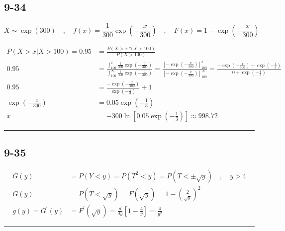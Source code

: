 \documentclass{article}
\newcommand{\qline}{\par\noindent\rule{4.5in}{1pt}}
\begin{document}
	\clearpage

		\subsection*{9-34}

			\[
				X \sim \exp(300) \quad,\quad f(x) = \frac{1}{300} \exp\left( -\frac{x}{300} \right) \quad,\quad F(x) = 1 - \exp\left( -\frac{x}{300} \right)
			\]

			\begin{equation*}
				\begin{split}
					P(X > x | X > 100) = 0.95 &= \frac{P(X > x \cap X > 100)}{P(X > 100)} \\
					0.95 &= \frac{\int_{100}^{x} \frac{1}{300} \exp\left( -\frac{x}{300} \right)}{\int_{100}^{\infty} \frac{1}{300} \exp\left( -\frac{x}{300} \right)} = \frac{\left[ -\exp\left( -\frac{x}{300} \right) \right]^x_{100}}{\left[ -\exp\left( -\frac{x}{300} \right) \right]^{\infty}_{100}} = \frac{-\exp\left( -\frac{x}{300} \right) + \exp\left( -\frac{1}{3} \right)}{0 + \exp\left( -\frac{1}{3} \right)} \\
					0.95 &= \frac{-\exp\left( -\frac{x}{300} \right)}{\exp\left( -\frac{1}{3} \right)} + 1 \\
					\exp\left( -\frac{x}{300} \right) &= 0.05 \exp\left( -\frac{1}{3} \right) \\
					x &= -300\ln\left[ 0.05 \exp\left( -\frac{1}{3} \right) \right] \approx \boxed{\num{998.72}}
				\end{split}
			\end{equation*}

	\qline

		\subsection*{9-35}

			\begin{equation*}
				\begin{split}
					G(y) &= P(Y < y) = P(T^2 < y) = P(T < \pm\sqrt{y}) \quad,\quad y > 4 \\
					G(y) &= P(T < \sqrt{y}) = F(\sqrt{y}) = 1 - \left( \frac{2}{\sqrt{y}} \right)^2 \\
					g(y) = G^\prime(y) &= F^\prime(\sqrt{y}) = \frac{d}{dy}\left[ 1 - \frac{4}{y} \right] = \boxed{\frac{4}{y^2}}
				\end{split}
			\end{equation*}

	\qline
\end{document}
